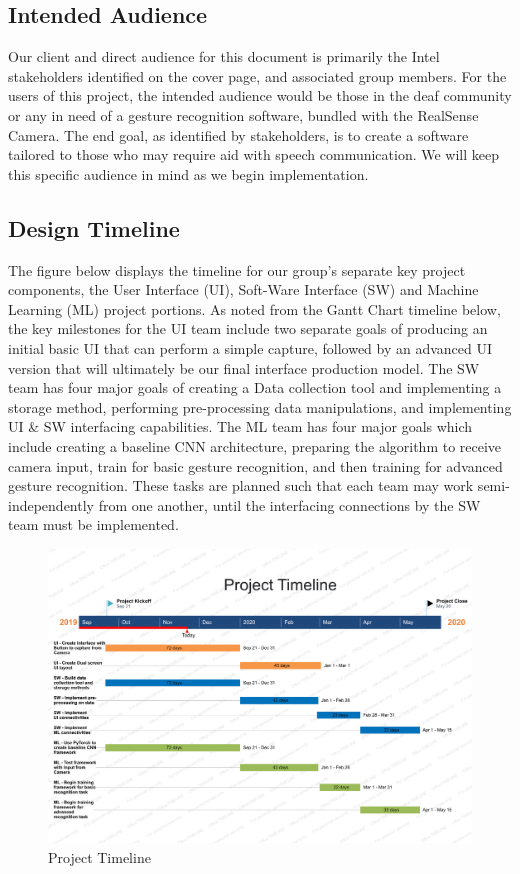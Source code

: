 \documentclass[onecolumn, draftclsnofoot,10pt, compsoc]{IEEEtran}
\begin{document}
\subsection{Intended Audience}
Our client and direct audience for this document is primarily the Intel stakeholders identified on the cover page, and associated group members. For the users of this project, the intended audience would be those in the deaf community or any in need of a gesture recognition software, bundled with the RealSense Camera. The end goal, as identified by stakeholders, is to create a software tailored to those who may require aid with speech communication. We will keep this specific audience in mind as we begin implementation.

\subsection{Design Timeline}
The figure below displays the timeline for our group's separate key project components, the User Interface (UI), Soft-Ware Interface (SW) and Machine Learning (ML) project portions. As noted from the Gantt Chart timeline below, the key milestones for the UI team include two separate goals of producing an initial basic UI that can perform a simple capture, followed by an advanced UI version that will ultimately be our final interface production model. The SW team has four major goals of creating a Data collection tool and implementing a storage method, performing pre-processing data manipulations, and implementing UI \& SW interfacing capabilities. The ML team has four major goals which include creating a baseline CNN architecture, preparing the algorithm to receive camera input, train for basic gesture recognition, and then training for advanced gesture recognition. These tasks are planned such that each team may work semi-independently from one another, until the interfacing connections by the SW team must be implemented.
 \begin{figure}[ht]
    \centering
    \includegraphics[width=1.0\textwidth]{GanttChart.png}
    \caption{Project Timeline}
    \label{fig:Figure 1}
\end{figure}
\end{document}
